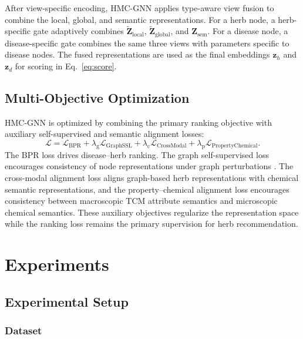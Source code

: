 \documentclass[journal,twoside,web]{ieeecolor}
\begin{document}
After view-specific encoding, HMC-GNN applies type-aware view fusion to combine the local, global, and semantic representations. For a herb node, a herb-specific gate adaptively combines $\widetilde{\mathbf{Z}}_{\mathrm{local}}$, $\widetilde{\mathbf{Z}}_{\mathrm{global}}$, and $\mathbf{Z}_{\mathrm{sem}}$. For a disease node, a disease-specific gate combines the same three views with parameters specific to disease nodes. The fused representations are used as the final embeddings $\mathbf{z}_h$ and $\mathbf{z}_d$ for scoring in Eq.~\eqref{eq:score}.

\subsection{Multi-Objective Optimization}
\label{subsec:optimization}

HMC-GNN is optimized by combining the primary ranking objective with auxiliary self-supervised and semantic alignment losses:
\begin{equation}
\mathcal{L}
=\mathcal{L}_{\mathrm{BPR}}
+\lambda_{\mathrm{g}}\mathcal{L}_{\mathrm{GraphSSL}}
+\lambda_{\mathrm{c}}\mathcal{L}_{\mathrm{CrossModal}}
+\lambda_{\mathrm{p}}\mathcal{L}_{\mathrm{PropertyChemical}}.
\label{eq:total_loss}
\end{equation}
The BPR loss drives disease--herb ranking. The graph self-supervised loss encourages consistency of node representations under graph perturbations \cite{ref52}. The cross-modal alignment loss aligns graph-based herb representations with chemical semantic representations, and the property--chemical alignment loss encourages consistency between macroscopic TCM attribute semantics and microscopic chemical semantics. These auxiliary objectives regularize the representation space while the ranking loss remains the primary supervision for herb recommendation.

\section{Experiments}
\label{sec:experiments}

\subsection{Experimental Setup}
\label{subsec:experimental_setup}

\subsubsection{Dataset}
\label{subsubsec:dataset}
\end{document}
